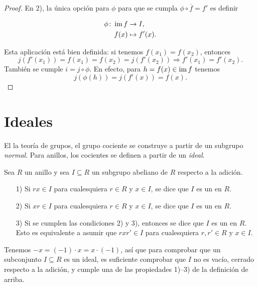 \begin{proposicion}
\begin{proof}
    En 2), la única opción para $\phi$ para que se cumpla
    $\phi\circ \overline{f} = f'$ es definir

    \begin{align*}
      \phi\colon \operatorname{im} f & \to I,\\
      f (x) & \mapsto f' (x).
    \end{align*}

    Esta aplicación está bien definida: si tenemos $f (x_1) = f (x_2)$,
    entonces
    \[ j (f' (x_1)) = f (x_1) = f (x_2) = j (f' (x_2)) \Rightarrow
       f' (x_1) = f' (x_2). \]
    También se cumple $i = j\circ \phi$. En efecto, para
    $h = f (x) \in \operatorname{im} f$ tenemos
    $$j (\phi (h)) = j (f' (x)) = f (x).$$
  \end{proof}
\end{proposicion}


\section{Ideales}

El la teoría de grupos, el grupo cociente se construye a partir de un subgrupo
\emph{normal}. Para anillos, los cocientes se definen a partir de
un \emph{ideal}.

\begin{definicion}
  Sea $R$ un anillo y sea $I \subseteq R$ un subgrupo abeliano de $R$ respecto
  a la adición.

  \begin{enumerate}
  \item[1)] Si $rx \in I$ para cualesquiera $r\in R$ y $x\in I$, se dice que $I$
    es un  en $R$.

  \item[2)] Si $xr \in I$ para cualesquiera $r\in R$ y $x\in I$, se dice que $I$
    es un  en $R$.

  \item[3)] Si se cumplen las condiciones 2) y 3), entonces se dice que $I$
    es un  en $R$.
    Esto es equivalente a asumir que $r x r' \in I$ para cualesquiera
    $r,r'\in R$ y $x \in I$.
  \end{enumerate}
\end{definicion}

\begin{comentario}
  Tenemos $-x = (-1)\cdot x = x\cdot (-1)$, así que para comprobar que
  un subconjunto $I \subseteq R$ es un ideal, es suficiente comprobar que $I$
  no es vacío, cerrado respecto a la adición, y cumple una de las propiedades
  1)--3) de la definición de arriba.
\end{comentario}

